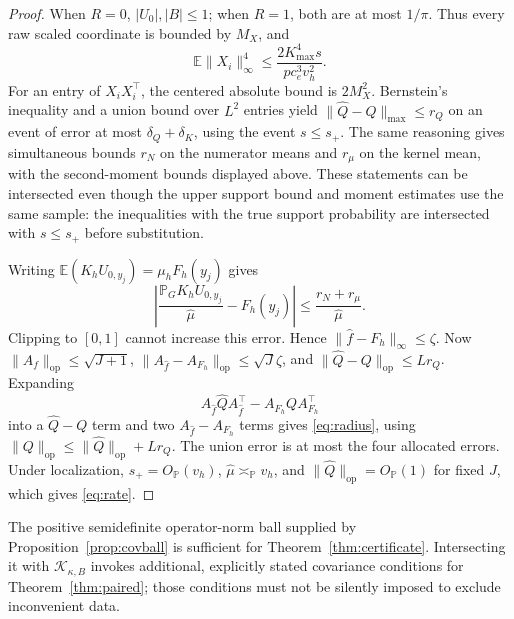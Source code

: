 \documentclass[11pt]{article}
\theoremstyle{remark}\newtheorem{remark}[theorem]{Remark}
\newcommand{\E}{\mathbb E}
\newcommand{\Pp}{\mathbb P}
\newcommand{\op}{\mathrm{op}}
\begin{document}
\begin{proof}
When $R=0$, $|U_0|,|B|\leq1$; when $R=1$, both are at most $1/\pi$. Thus every raw scaled coordinate is bounded by $M_X$, and
\[
 \E\|X_i\|_\infty^4\leq\frac{2K_{\max}^4s}{p c_e^3v_h^2}.
\]
For an entry of $X_iX_i^\top$, the centered absolute bound is $2M_X^2$. Bernstein's inequality and a union bound over $L^2$ entries yield
$\|\widehat Q-Q\|_{\max}\leq r_Q$ on an event of error at most $\delta_Q+\delta_K$, using the event $s\leq s_+$.
The same reasoning gives simultaneous bounds $r_N$ on the numerator means and $r_\mu$ on the kernel mean, with the second-moment bounds displayed above. These statements can be intersected even though the upper support bound and moment estimates use the same sample: the inequalities with the true support probability are intersected with $s\leq s_+$ before substitution.

Writing $\E(K_hU_{0,y_j})=\mu_hF_h(y_j)$ gives
\[
 \left|\frac{\mathbb P_GK_hU_{0,y_j}}{\widehat\mu}-F_h(y_j)\right|
 \leq\frac{r_N+r_\mu}{\widehat\mu}.
\]
Clipping to $[0,1]$ cannot increase this error. Hence $\|\widehat f-F_h\|_\infty\leq\zeta$.
Now $\|A_f\|_\op\leq\sqrt{J+1}$,
$\|A_{\widehat f}-A_{F_h}\|_\op\leq\sqrt J\zeta$, and
$\|\widehat Q-Q\|_\op\leq Lr_Q$. Expanding
\[
 A_{\widehat f}\widehat Q A_{\widehat f}^\top-A_{F_h}QA_{F_h}^\top
\]
into a $\widehat Q-Q$ term and two $A_{\widehat f}-A_{F_h}$ terms gives \eqref{eq:radius}, using $\|Q\|_\op\leq\|\widehat Q\|_\op+Lr_Q$.
The union error is at most the four allocated errors. Under localization, $s_+=O_\Pp(v_h)$, $\widehat\mu\asymp_\Pp v_h$, and $\|\widehat Q\|_\op=O_\Pp(1)$ for fixed $J$, which gives \eqref{eq:rate}.
\end{proof}

The positive semidefinite operator-norm ball supplied by Proposition~\ref{prop:covball} is sufficient for Theorem~\ref{thm:certificate}. Intersecting it with $\mathcal K_{\kappa,B}$ invokes additional, explicitly stated covariance conditions for Theorem~\ref{thm:paired}; those conditions must not be silently imposed to exclude inconvenient data.
\end{document}
